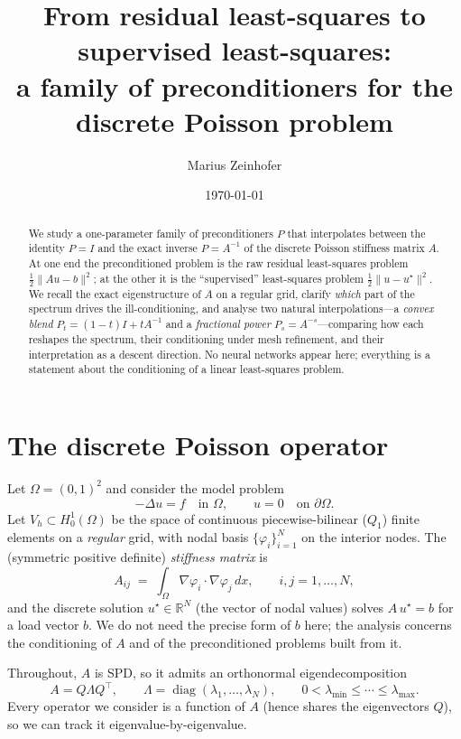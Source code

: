 \documentclass[11pt]{article}
\title{From residual least-squares to supervised least-squares:\\
a family of preconditioners for the discrete Poisson problem}
\author{Marius Zeinhofer}
\date{\today}
\newcommand{\R}{\mathbb{R}}
\newcommand{\Om}{\Omega}
\newcommand{\ustar}{u^\star}
\DeclareMathOperator{\diag}{diag}
\begin{document}
\maketitle

\begin{abstract}
We study a one-parameter family of preconditioners $P$ that interpolates between the
identity $P=I$ and the exact inverse $P=A^{-1}$ of the discrete Poisson stiffness matrix
$A$. At one end the preconditioned problem is the raw residual least-squares problem
$\tfrac12\|Au-b\|^2$; at the other it is the ``supervised'' least-squares problem
$\tfrac12\|u-\ustar\|^2$. We recall the exact eigenstructure of $A$ on a regular grid,
clarify \emph{which} part of the spectrum drives the ill-conditioning, and analyse two
natural interpolations---a \emph{convex blend} $P_t=(1-t)I+tA^{-1}$ and a
\emph{fractional power} $P_s=A^{-s}$---comparing how each reshapes the spectrum, their
conditioning under mesh refinement, and their interpretation as a descent direction.
No neural networks appear here; everything is a statement about the conditioning of a
linear least-squares problem.
\end{abstract}

\section{The discrete Poisson operator}

Let $\Om=(0,1)^2$ and consider the model problem
\begin{equation}
  -\Delta u = f \quad\text{in }\Om, \qquad u=0 \quad\text{on }\partial\Om .
\end{equation}
Let $V_h\subset H_0^1(\Om)$ be the space of continuous piecewise-bilinear ($Q_1$) finite
elements on a \emph{regular} grid, with nodal basis $\{\varphi_i\}_{i=1}^{N}$ on the
interior nodes. The (symmetric positive definite) \emph{stiffness matrix} is
\begin{equation}
  A_{ij} \;=\; \int_\Om \nabla\varphi_i \cdot \nabla\varphi_j \, dx ,
  \qquad i,j = 1,\dots,N ,
  \label{eq:stiffness}
\end{equation}
and the discrete solution $\ustar\in\R^{N}$ (the vector of nodal values) solves
$A\,\ustar = b$ for a load vector $b$. We do not need the precise form of $b$ here; the
analysis concerns the conditioning of $A$ and of the preconditioned problems built from it.

Throughout, $A$ is SPD, so it admits an orthonormal eigendecomposition
\begin{equation}
  A = Q\Lambda Q^\top,\qquad \Lambda = \diag(\lambda_1,\dots,\lambda_N),\qquad
  0<\lambda_{\min}\le\cdots\le\lambda_{\max}.
\end{equation}
Every operator we consider is a function of $A$ (hence shares the eigenvectors $Q$), so we
can track it eigenvalue-by-eigenvalue.
\end{document}

